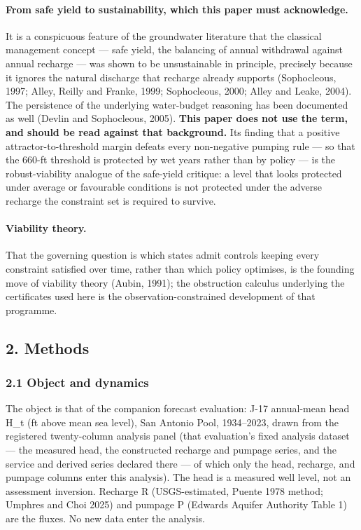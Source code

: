 \paragraph{From safe yield to sustainability, which this paper must acknowledge.} It is a
conspicuous feature of the groundwater literature that the classical management concept ---
safe yield, the balancing of annual withdrawal against annual recharge --- was shown to be
unsustainable in principle, precisely because it ignores the natural discharge that recharge
already supports (Sophocleous, 1997; Alley, Reilly and Franke, 1999; Sophocleous, 2000; Alley
and Leake, 2004). The persistence of the underlying water-budget reasoning has been
documented as well (Devlin and Sophocleous, 2005). \textbf{This paper does not use the term,
and should be read against that background.} Its finding that a positive attractor-to-threshold
margin defeats every non-negative pumping rule --- so that the 660-ft threshold is protected
by wet years rather than by policy --- is the robust-viability analogue of the safe-yield
critique: a level that looks protected under average or favourable conditions is not
protected under the adverse recharge the constraint set is required to survive.

\paragraph{Viability theory.} That the governing question is which states admit controls
keeping every constraint satisfied over time, rather than which policy optimises, is the
founding move of viability theory (Aubin, 1991); the obstruction calculus underlying the
certificates used here is the observation-constrained development of that programme.

\subsection{2. Methods}\label{edw-methods}

\subsubsection{2.1 Object and dynamics}\label{edw-object-and-dynamics}

The object is that of the companion forecast evaluation: J-17
annual-mean head H\_t (ft above mean sea level), San Antonio Pool,
1934--2023, drawn from the registered twenty-column analysis panel
(that evaluation's fixed analysis dataset --- the measured head, the
constructed recharge and pumpage series, and the service and derived
series declared there --- of which only the head, recharge, and pumpage
columns enter this analysis). The
head is a measured well level, not an assessment inversion. Recharge R
(USGS-estimated, Puente 1978 method; Umphres and Choi 2025) and pumpage
P (Edwards Aquifer Authority Table 1) are the fluxes. No new data enter
the analysis.

